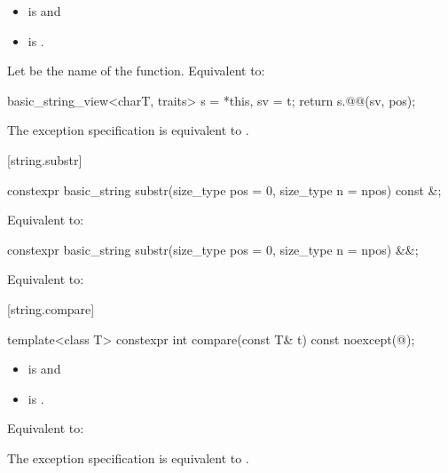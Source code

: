 \begin{itemdescr}
\pnum
\constraints
\begin{itemize}
\item
{} is
 and
\item
{} is
.
\end{itemize}

\pnum
\effects
Let  be the name of the function.
Equivalent to:
\begin{codeblock}
basic_string_view<charT, traits> s = *this, sv = t;
return s.@@(sv, pos);
\end{codeblock}

\pnum
\remarks
The exception specification is equivalent to
.
\end{itemdescr}

[string.substr]{}

%
\begin{itemdecl}
constexpr basic_string substr(size_type pos = 0, size_type n = npos) const &;
\end{itemdecl}

\begin{itemdescr}
\pnum
\effects
Equivalent to: 
\end{itemdescr}

%
\begin{itemdecl}
constexpr basic_string substr(size_type pos = 0, size_type n = npos) &&;
\end{itemdecl}

\begin{itemdescr}
\pnum
\effects
Equivalent to: 
\end{itemdescr}

[string.compare]{}

%
\begin{itemdecl}
template<class T>
  constexpr int compare(const T& t) const noexcept(@\seebelow@);
\end{itemdecl}

\begin{itemdescr}
\pnum
\constraints
\begin{itemize}
\item
{} is
 and
\item
{} is
.
\end{itemize}

\pnum
\effects
Equivalent to: 

\pnum
\remarks
The exception specification is equivalent to
.
\end{itemdescr}

